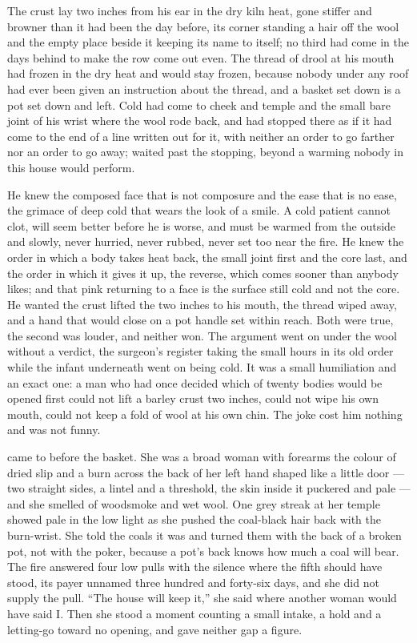The crust lay two inches from his ear in the dry kiln heat, gone stiffer and browner than it had been the day before, its corner standing a hair off the wool and the empty place beside it keeping its name to itself; no third had come in the days behind to make the row come out even. The thread of drool at his mouth had frozen in the dry heat and would stay frozen, because nobody under any roof had ever been given an instruction about the thread, and a basket set down is a pot set down and left. Cold had come to cheek and temple and the small bare joint of his wrist where the wool rode back, and had stopped there as if it had come to the end of a line written out for it, with neither an order to go farther nor an order to go away;  waited past the stopping, beyond a warming nobody in this house would perform.

He knew the composed face that is not composure and the ease that is no ease, the grimace of deep cold that wears the look of a smile. A cold patient cannot clot, will seem better before he is worse, and must be warmed from the outside and slowly, never hurried, never rubbed, never set too near the fire. He knew the order in which a body takes heat back, the small joint first and the core last, and the order in which it gives it up, the reverse, which comes sooner than anybody likes; and that pink returning to a face is the surface still cold and not the core. He wanted the crust lifted the two inches to his mouth, the thread wiped away, and a hand that would close on a pot handle set within reach. Both were true, the second was louder, and neither won. The argument went on under the wool without a verdict, the surgeon's register taking the small hours in its old order while the infant underneath went on being cold. It was a small humiliation and an exact one: a man who had once decided which of twenty bodies would be opened first could not lift a barley crust two inches, could not wipe his own mouth, could not keep a fold of wool at his own chin. The joke cost him nothing and was not funny.

\scenebreak

 came to  before the basket. She was a broad woman with forearms the colour of dried slip and a burn across the back of her left hand shaped like a little door --- two straight sides, a lintel and a threshold, the skin inside it puckered and pale --- and she smelled of woodsmoke and wet wool. One grey streak at her temple showed pale in the low light as she pushed the coal-black hair back with the burn-wrist. She told the coals it was  and turned them with the back of a broken pot, not with the poker, because a pot's back knows how much a coal will bear. The fire answered four low pulls with the silence where the fifth should have stood, its payer unnamed three hundred and forty-six days, and she did not supply the pull. “The house will keep it,” she said where another woman would have said I. Then she stood a moment counting a small intake, a hold and a letting-go toward no opening, and gave neither gap a figure.

